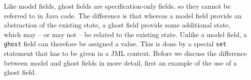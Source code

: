 \documentclass{llncs}
\begin{document}
Like model fields, ghost fields are specification-only fields,
so they cannot be referred to in Java code.
The difference is that whereas a model field provide an abstraction
of the existing state, a ghost field provide some additional state,
which may -- or may not -- be related to the existing state.
Unlike a model field, a \texttt{ghost} field can therefore
be assigned a value. This is done by a special \texttt{set} statement
that has to be given in a JML context.
Before we discuss the difference between model and ghost fields
in more detail, first an example of the use of a ghost field.

% 
% 
% 
% 
\end{document}
